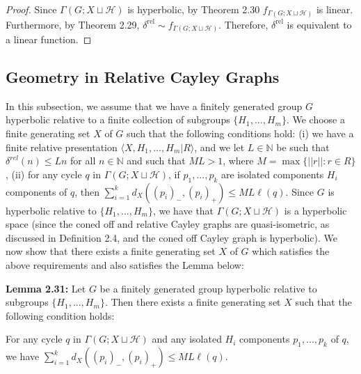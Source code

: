\documentclass[12pt]{article}
\newcommand{\vs}{\vskip10pt}
\begin{document}
	\begin{proof}
		
		Since $\Gamma(G; X \sqcup \mathcal{H})$ is hyperbolic, by Theorem 2.30 $f_{\Gamma(G; X \sqcup \mathcal{H})}$ is linear. Furthermore, by Theorem 2.29, $\delta^{\text{rel}} \sim f_{\Gamma(G; X \sqcup \mathcal{H})}$. Therefore, $\delta^{\text{rel}}$ is equivalent to a linear function.
		
	\end{proof} 


\newpage
	\subsection{Geometry in Relative Cayley Graphs}
	
	In this subsection, we assume that we have a finitely generated group $G$ hyperbolic relative to a finite collection of subgroups $\{H_1,...,H_m\}$. We choose a finite generating set $X$ of $G$ such that the following conditions hold: (i) we have a finite relative presentation $\langle X, H_1,...,H_m \vert R \rangle$, and we let $L \in \mathbb{N}$ be such that $\delta^{rel}(n) \leq Ln$ for all $n \in \mathbb{N}$ and such that $ML > 1$, where $M = \max \{\vert \vert r \vert \vert : r \in R\}$, (ii) for any cycle $q$ in $\Gamma(G; X \sqcup \mathcal{H})$, if $p_1,...,p_k$ are isolated components $H_i$ components of $q$, then $\sum_{i=1}^k d_X((p_i)_-, (p_i)_+) \leq ML \ell(q)$. Since $G$ is hyperbolic relative to $\{H_1,...,H_m\}$, we have that $\Gamma(G; X \sqcup \mathcal{H})$ is a hyperbolic space (since the coned off and relative Cayley graphs are quasi-isometric, as discussed in Definition 2.4, and the coned off Cayley graph is hyperbolic). We now show that there exists a finite generating set $X$ of $G$ which satisfies the above requirements and also satisfies the Lemma below: 
	
	\vs 
	
	\textbf{Lemma 2.31: } Let $G$ be a finitely generated group hyperbolic relative to subgroups $\{H_1,...,H_m\}$. Then there exists a finite generating set $X$ such that the following condition holds: 
	
	\vs 
	
	For any cycle $q$ in $\Gamma(G; X \sqcup \mathcal{H})$ and any isolated $H_i$ components $p_1,...,p_k$ of $q$, we have $\sum_{i=1}^k d_X((p_i)_{-}, (p_i)_{+}) \leq ML \ell(q)$. 
	
\end{document}
